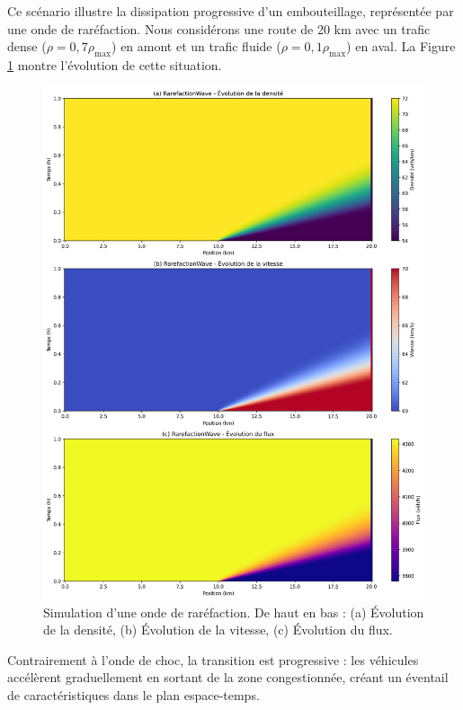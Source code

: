 Ce scénario illustre la dissipation progressive d'un embouteillage, représentée par une onde de raréfaction. Nous considérons une route de 20 km avec un trafic dense ($\rho = 0,7\rho_{\max}$) en amont et un trafic fluide ($\rho = 0,1\rho_{\max}$) en aval. La Figure \ref{fig:sim_rarefaction} montre l'évolution de cette situation.

\begin{figure}[htbp]
\centering
\includegraphics[width=1.0\textwidth]{simulations/LWR/rarefaction/RarefactionWave_combined}
\caption{Simulation d'une onde de raréfaction. De haut en bas : (a) Évolution de la densité, (b) Évolution de la vitesse, (c) Évolution du flux.}
\label{fig:sim_rarefaction}
\end{figure}

Contrairement à l'onde de choc, la transition est progressive : les véhicules accélèrent graduellement en sortant de la zone congestionnée, créant un éventail de caractéristiques dans le plan espace-temps.

